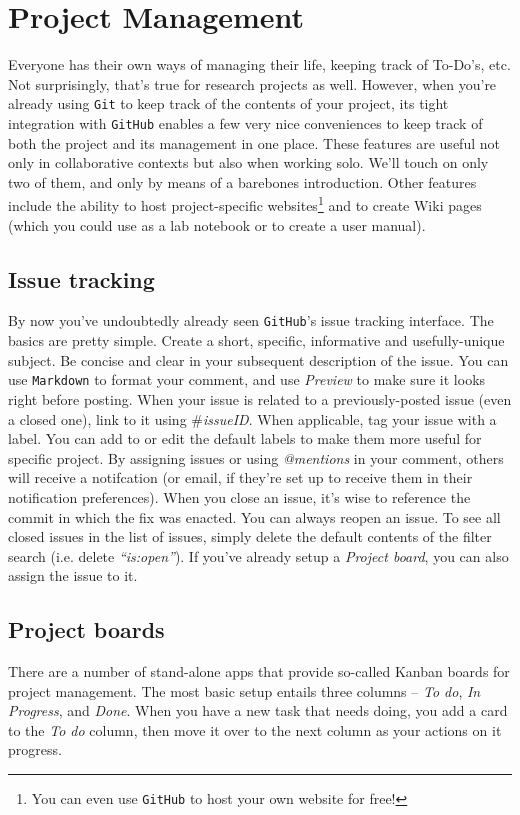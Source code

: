 \documentclass[12pt,letterpaper]{article}
\begin{document}
\section{Project Management}
Everyone has their own ways of managing their life, keeping track of To-Do's, etc.
Not surprisingly, that's true for research projects as well.
However, when you're already using \texttt{Git} to keep track of the contents of your project, its tight integration with \texttt{GitHub} enables a few very nice conveniences to keep track of both the project and its management in one place.
These features are useful not only in collaborative contexts but also when working solo.
We'll touch on only two of them, and only by means of a barebones introduction.
Other features include the ability to host project-specific websites\footnote{You 
can even use \texttt{GitHub} to host your own website for free!} and to 
create Wiki pages (which you could use as a lab notebook or to create a user 
manual).


\subsection{Issue tracking}
By now you've undoubtedly already seen \texttt{GitHub}'s issue tracking 
interface.
The basics are pretty simple.
Create a short, specific, informative and usefully-unique subject.
Be concise and clear in your subsequent description of the issue.
You can use \texttt{Markdown} to format your comment, and use \emph{Preview} to make sure it looks right before posting.
When your issue is related to a previously-posted issue (even a closed one), link to it using \emph{$\#$issueID}.
When applicable, tag your issue with a label.
You can add to or edit the default labels to make them more useful for specific project.
By assigning issues or using \emph{@mentions} in your comment, others will receive a notifcation (or email, if they're set up to receive them in their notification preferences).
When you close an issue, it's wise to reference the commit in which the fix was enacted.
You can always reopen an issue.
To see all closed issues in the list of issues, simply delete the default contents of the filter search (i.e. delete \emph{``is:open''}).
If you've already setup a \emph{Project board}, you can also assign the issue to it.


\subsection{Project boards}
There are a number of stand-alone apps that provide so-called Kanban boards for project management.
The most basic setup entails three columns -- \emph{To do}, \emph{In Progress}, and \emph{Done}.
When you have a new task that needs doing, you add a card to the \emph{To do} column, then move it over to the next column as your actions on it progress.
\end{document}
